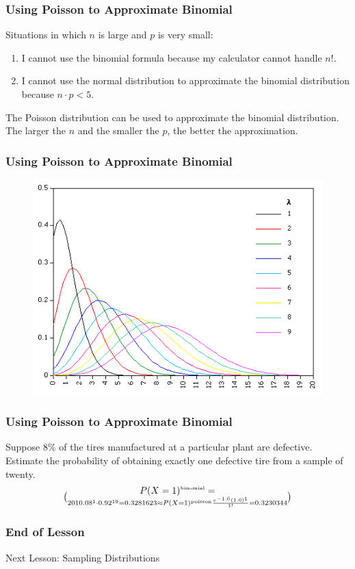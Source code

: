 \documentclass[xcolor=dvipsnames]{beamer}
\begin{document}
\begin{frame}
  \frametitle{Using Poisson to Approximate Binomial}
  Situations in which $n$ is large and $p$ is very small:
  \begin{enumerate}
  \item I cannot use the binomial formula because my calculator cannot
    handle $n!$.
  \item I cannot use the normal distribution to approximate the
    binomial distribution because $n\cdot{}p<5$.
  \end{enumerate}
  The Poisson distribution can be used to approximate the binomial
  distribution. The larger the $n$ and the smaller the $p$, the better
  the approximation.
\end{frame}

\begin{frame}
  \frametitle{Using Poisson to Approximate Binomial}
    \begin{figure}[h]
    \includegraphics[scale=.7]{./diagrams/poisdist.png}
  \end{figure}
\end{frame}

\begin{frame}
  \frametitle{Using Poisson to Approximate Binomial}
   Suppose 8\% of the tires manufactured
  at a particular plant are defective. Estimate the probability of obtaining
  exactly one defective tire from a sample of twenty.
  \begin{equation}
    \label{eq:eikaiche}
    P(X=1)^{\mbox{\tiny binomial}}=\choose{20}{1}0.08^{1}\cdot0.92^{19}=0.3281623\approx{}P(X=1)^{\mbox{\tiny poisson}}\frac{e^{-1.6}(1.6)^{1}}{1!}=0.3230344
  \end{equation}
\end{frame}

\begin{frame}
  \frametitle{End of Lesson}
Next Lesson: Sampling Distributions
\end{frame}
\end{document}
